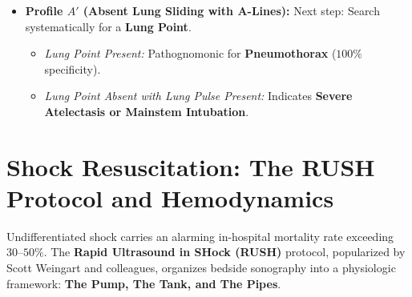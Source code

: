 \documentclass[11pt,a4paper]{article}
\begin{document}
\begin{protocolbox}
\begin{enumerate}[leftmargin=1.5em]
\begin{itemize}
\begin{itemize}
            \item \textit{Profile C:} Anterior consolidation displaying the shred sign or tissue-like pattern with dynamic air bronchograms.
            \item Indicates \textbf{Pneumonia / Focal Lung Sepsis}.
        \end{itemize}
        \item \textbf{Profile $A'$ (Absent Lung Sliding with A-Lines):}
        Next step: Search systematically for a \textbf{Lung Point}.
        \begin{itemize}
            \item \textit{Lung Point Present:} Pathognomonic for \textbf{Pneumothorax} ($100\%$ specificity).
            \item \textit{Lung Point Absent with Lung Pulse Present:} Indicates \textbf{Severe Atelectasis or Mainstem Intubation}.
        \end{itemize}
    \end{itemize}
\end{enumerate}
\end{protocolbox}

\section[The RUSH Protocol and Bedside Hemodynamics]{Shock Resuscitation: The RUSH Protocol and Hemodynamics}
Undifferentiated shock carries an alarming in-hospital mortality rate exceeding $30\text{--}50\%$. The \textbf{Rapid Ultrasound in SHock (RUSH)} protocol, popularized by Scott Weingart and colleagues, organizes bedside sonography into a physiologic framework: \textbf{The Pump, The Tank, and The Pipes}.
\end{document}
